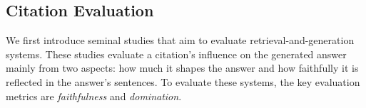 
\subsection{Citation Evaluation}
\label{subsec:citation_evaluation}
We first introduce seminal studies that aim to evaluate retrieval-and-generation systems.
These studies evaluate a citation's influence on the generated answer mainly from two aspects: how much it shapes the answer and how faithfully it is reflected in the answer's sentences.
To evaluate these systems, the key evaluation metrics are \emph{faithfulness} and \emph{domination}.

